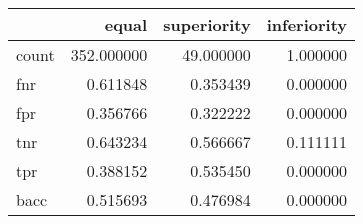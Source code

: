 \begin{tabular}{lrrr}
\toprule
{} &       equal &  superiority &  inferiority \\
\midrule
count &  352.000000 &    49.000000 &     1.000000 \\
fnr   &    0.611848 &     0.353439 &     0.000000 \\
fpr   &    0.356766 &     0.322222 &     0.000000 \\
tnr   &    0.643234 &     0.566667 &     0.111111 \\
tpr   &    0.388152 &     0.535450 &     0.000000 \\
bacc  &    0.515693 &     0.476984 &     0.000000 \\
\bottomrule
\end{tabular}
